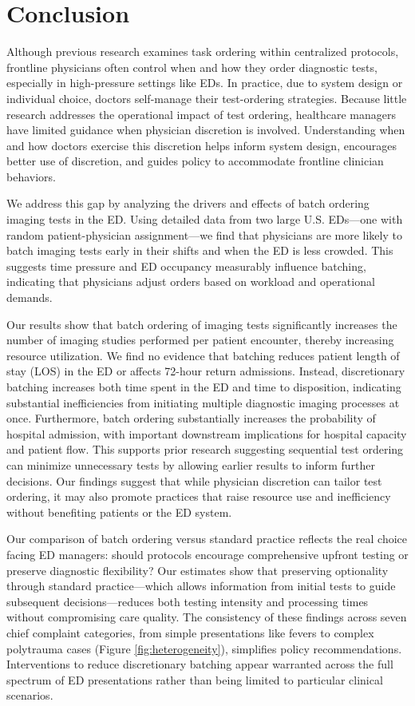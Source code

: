 \documentclass[,,blindrev]{informs}
\begin{document}
\section{Conclusion}\label{conclusion}

Although previous research examines task ordering within centralized
protocols, frontline physicians often control when and how they order
diagnostic tests, especially in high-pressure settings like EDs. In
practice, due to system design or individual choice, doctors self-manage
their test-ordering strategies. Because little research addresses the
operational impact of test ordering, healthcare managers have limited
guidance when physician discretion is involved. Understanding when and
how doctors exercise this discretion helps inform system design,
encourages better use of discretion, and guides policy to accommodate
frontline clinician behaviors.

We address this gap by analyzing the drivers and effects of batch
ordering imaging tests in the ED. Using detailed data from two large
U.S. EDs---one with random patient-physician assignment---we find that
physicians are more likely to batch imaging tests early in their shifts
and when the ED is less crowded. This suggests time pressure and ED
occupancy measurably influence batching, indicating that physicians
adjust orders based on workload and operational demands.

Our results show that batch ordering of imaging tests significantly
increases the number of imaging studies performed per patient encounter,
thereby increasing resource utilization. We find no evidence that
batching reduces patient length of stay (LOS) in the ED or affects
72-hour return admissions. Instead, discretionary batching increases
both time spent in the ED and time to disposition, indicating
substantial inefficiencies from initiating multiple diagnostic imaging
processes at once. Furthermore, batch ordering substantially increases
the probability of hospital admission, with important downstream
implications for hospital capacity and patient flow. This supports prior
research suggesting sequential test ordering can minimize unnecessary
tests by allowing earlier results to inform further decisions. Our
findings suggest that while physician discretion can tailor test
ordering, it may also promote practices that raise resource use and
inefficiency without benefiting patients or the ED system.

Our comparison of batch ordering versus standard practice reflects the
real choice facing ED managers: should protocols encourage comprehensive
upfront testing or preserve diagnostic flexibility? Our estimates show
that preserving optionality through standard practice---which allows
information from initial tests to guide subsequent decisions---reduces
both testing intensity and processing times without compromising care
quality. The consistency of these findings across seven chief complaint
categories, from simple presentations like fevers to complex polytrauma
cases (Figure \ref{fig:heterogeneity}), simplifies policy
recommendations. Interventions to reduce discretionary batching appear
warranted across the full spectrum of ED presentations rather than being
limited to particular clinical scenarios.
\end{document}
